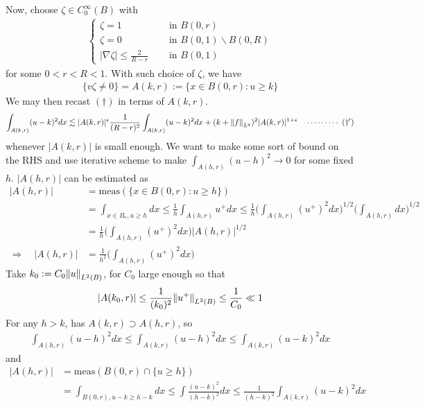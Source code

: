 \documentclass[12pt,a4paper]{article}
\newenvironment{proof}
{\begin{changemargin}{0.5cm}{0.5cm} 
	}%
	{\end{changemargin}
}
\newenvironment{p}
{\begin{proof} 
	}%
	{\end{proof}
}
\begin{document}
\begin{p}
Now, choose $\zeta \in C_0^{\infty}(B)$ with
\begin{align*}
\begin{cases}
\zeta =1 \quad &\text{ in }B(0, r)\\
\zeta =0 \quad &\text{ in }B(0, 1) \backslash B(0, R)\\
|\nabla \zeta| \leq \frac{2}{R-r} \quad &\text{ in }B(0,1)
\end{cases}
\end{align*}
for some $0<r<R<1$. With such choice of $\zeta$, we have
\begin{align*}
\{v \zeta \neq 0 \} =  A(k,r) := \{ x\in B(0, r) : u \geq k\}
\end{align*}
We may then recast $(\dagger)$ in terms of $A(k,r)$.
\begin{align*}
\int_{A(k,r)} (u-k)^2 dx \lesssim |A(k,r)|^{\epsilon} \frac{1}{(R-r)^2} \int_{A(k,r)} (u-k)^2 dx + (k+ \snorms{f}{L^q})^2 |A(k,r)|^{1+ \epsilon} \call{\dagger'}
\end{align*}
whenever $|A(k,r)|$ is small enough. We want to make some sort of bound on the RHS and use iterative scheme to make $\int_{A(h,r)} (u-h)^2 \rightarrow 0$ for some fixed $h$. $|A(h,r)|$ can be estimated as
\begin{align*}
|A(h,r)| &=\text{meas}(\{x\in B(0, r) : u\geq h\}) \\
&= \int_{x\in B_r, u\geq h} dx \leq \frac{1}{h} \int_{A(h,r)} u^+ dx \leq \frac{1}{h} \Big( \int_{A(h,r)} (u^+)^2 dx \Big)^{1/2} \Big(\int_{A(h,r)} dx \Big)^{1/2} \\
&= \frac{1}{h} \Big( \int_{A(h,r)} (u^+)^2 dx \Big) |A(h,r)|^{1/2} \\
\Rightarrow \quad |A(h,r)| &= \frac{1}{h^2} \Big( \int_{A(h,r)} (u^+)^2 dx \Big)
\end{align*}
Take $k_0 := C_0 \snorms{u}{L^2(B)}$, for $C_0$ large enough so that
\begin{align*}
|A(k_0,r)| \leq \frac{1}{(k_0)^2} \snorms{u^+}{L^2(B)} \leq \frac{1}{C_0} \ll 1
\end{align*}
For any $h>k$, has $A(k,r) \supset A(h,r)$, so
\begin{align*}
\int_{A(h,r)}(u-h)^2 dx \leq \int_{A(k,r)} (u-h)^2  dx \leq \int_{A(k,r)} (u-k)^2 dx
\end{align*}
and
\begin{align*}
|A(h,r)| &= \text{meas}(B(0,r) \cap \{ u \geq h \}) \\
&= \int_{B(0,r), u-k \geq h-k} dx \leq \int \frac{(u-k)^2}{(h-k)^2} dx \leq \frac{1}{(h-k)^2} \int_{A(k,r)} (u-k)^2 dx

\end{align*}
\end{p}
\end{document}

